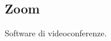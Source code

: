\documentclass[../glossario.tex]{subfiles}
\begin{document}
\subsection*{Zoom}
{}
Software di videoconferenze.
\end{document}
